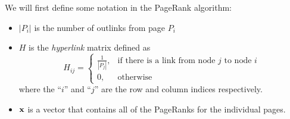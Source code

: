 We will first define some notation in the PageRank algorithm:
\begin{itemize}
    \item $|P_i|$ is the number of outlinks from page $P_i$
    \item $H$ is the {\it hyperlink} matrix defined as 
        \[ H_{ij} = \left\{ \begin{array}{cl} \frac{1}{|P_j|}, & \text{if there is a link
            from node $j$ to node $i$} \\ 0, & \text{otherwise} \end{array} \right. \]
        where the ``$i$'' and ``$j$'' are the row and column indices respectively.  
    \item ${\bf x}$ is a vector that contains all of the PageRanks for the individual pages.
\end{itemize}

